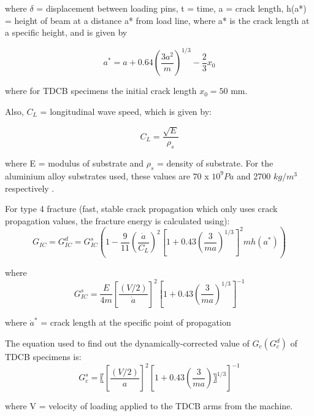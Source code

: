 \documentclass[numbers=noendperiod,chapterprefix=on]{icldt} %
\begin{document}
where $ \delta $ = displacement between loading pins, t = time, a = crack length, h(a*) = height of beam at a distance a* from load line, where a* is the crack length at a specific height, and is given by

\begin{equation} 
a^\ast=a+0.64 \left( \frac{3a^2}{m}\right) ^{1/3}-\frac{2}{3}x_0
\end{equation}

where for TDCB specimens the initial crack length $x_0= 50 $ mm.

Also, $ C_{L} $ = longitudinal wave speed, which is given by:

\begin{equation} 
C_L= \frac{\sqrt{E}}{\rho_s}
\end{equation}

where E = modulus of substrate and $\rho_{s}$ = density of substrate. For the aluminium alloy substrates used, these values are $ 70$ x $10^{9}  Pa $ and 2700 $kg/m^3$ respectively \cite{Blackman1995}. 

For type 4 fracture (fast, stable crack propagation which only uses crack propagation values, the fracture energy is calculated using):
\begin{equation} 
G_{IC} = G_{IC}^d = G_{IC}^s  
\left( 
1 - \frac{9}{11} 
\left( \frac{\dot{a}}{C_{L}} \right) ^2
\left[
1+ 0.43 \left( \frac{3}{ma}\right) ^{1/3}
\right]^2 
 m h(a^{\ast})
\right) 
\end{equation}

where
\begin{equation}
G_{IC}^s = \frac{E}{4m}
\left[ \frac{(V/2)}{\dot{a}}\right]^2
\left[ 1+0.43\left( \frac{3}{ma}\right) ^{1/3}
\right] ^{-1}
\end{equation}

where $ \dot{a}^\ast $ = crack length at the specific point of propagation 

The equation used to find out the dynamically-corrected value of $G_c (G^d_c)$ of TDCB specimens is:
\begin{equation} 
G_c^s=〖\left[\frac{(V/2)}{a}\right]^2 \left[1+0.43\left(\frac{3}{ma}\right) 〗^{1/3}\right]^{-1}
\end{equation}

where V = velocity of loading applied to the TDCB arms from the machine. %
\end{document}
